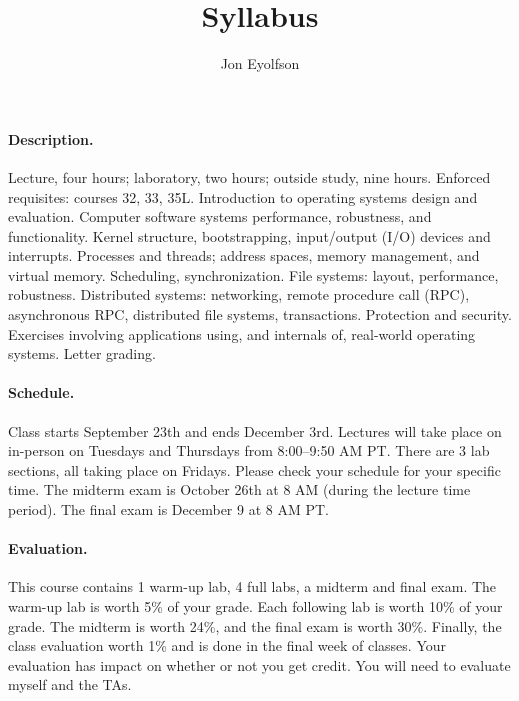 \documentclass[12pt]{article}
\title{Syllabus}
\author{Jon Eyolfson}
\begin{document}

\noindent {\Large \bfseries \color{uclablue} \thetitle}


\noindent {\normalsize \theauthor}

\paragraph{Description.}

Lecture, four hours; laboratory, two hours; outside study, nine hours.
Enforced requisites: courses 32, 33, 35L.
Introduction to operating systems design and evaluation.
Computer software systems performance, robustness, and functionality.
Kernel structure, bootstrapping, input/output (I/O) devices and interrupts.
Processes and threads; address spaces, memory management, and virtual memory.
Scheduling, synchronization.
File systems: layout, performance, robustness.
Distributed systems: networking, remote procedure call (RPC), asynchronous RPC,
distributed file systems, transactions.
Protection and security.
Exercises involving applications using, and internals of, real-world operating
systems.
Letter grading.

\paragraph{Schedule.}

Class starts September 23th and ends December 3rd.
Lectures will take place on in-person on Tuesdays and Thursdays from
8:00--9:50 AM PT.
There are 3 lab sections, all taking place on Fridays.
Please check your schedule for your specific time.
The midterm exam is October 26th at 8 AM (during the lecture time period).
The final exam is December 9 at 8 AM PT.

\paragraph{Evaluation.}

This course contains 1 warm-up lab, 4 full labs, a midterm and final exam.
The warm-up lab is worth 5\% of your grade.
Each following lab is worth 10\% of your grade.
The midterm is worth 24\%, and the final exam is worth 30\%.
Finally, the class evaluation worth 1\% and is done in the final week of classes.
Your evaluation has impact on whether or not you get credit.
You will need to evaluate myself and the TAs.
\end{document}
